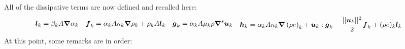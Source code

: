 All of the dissipative terms are now defined and recalled here:
%
\begin{subequations}\label{eq:visc-reg-7-equ-sect4}
\begin{align}
  \mbold l_k &= \beta_k A \grad \alpha_k 
\end{align}
\begin{align}
  \mbold f_k &= \alpha_k A \kappa_k \grad \rho_k + \rho_k A \mbold l_k 
\end{align}
\begin{align}
  \mbold g_k &= \alpha_k A \mu_k \rho \grad^s \mbold u_k 
\end{align}
\begin{align}
  \mbold h_k &=  \alpha_k A \kappa_k \grad \left( \rho e \right)_k + \mbold u_k : \mbold g_k - \frac{|| \mbold u_k||^2}{2} \mbold f_k + (\rho e)_k \mbold l_k 
\end{align}
\end{subequations}
%
At this point, some remarks are in order:
